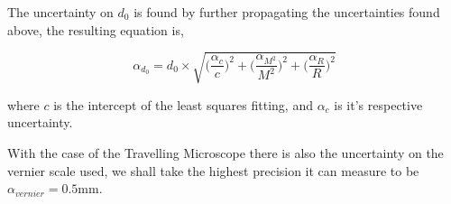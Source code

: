 \documentclass[twocolumn]{revtex4}
\begin{document}
The uncertainty on $d_0$ is found by further propagating the uncertainties found above, the resulting equation is, 

\begin{equation} 
\alpha_{d_0}=d_0\times\sqrt{\Big(\frac{\alpha_c}{c}\Big)^2 + \Big(\frac{\alpha_{M^2}}{M^2}\Big)^2 + \Big(\frac{\alpha_R}{R}\Big)^2}
\end{equation}

where $c$ is the intercept of the least squares fitting, and $\alpha_c$ is it's respective uncertainty.

With the case of the Travelling Microscope there is also the uncertainty on the vernier scale used, we shall take the highest precision it can measure to be $\alpha_{vernier}=0.5$mm.

\clearpage

\end{document}
